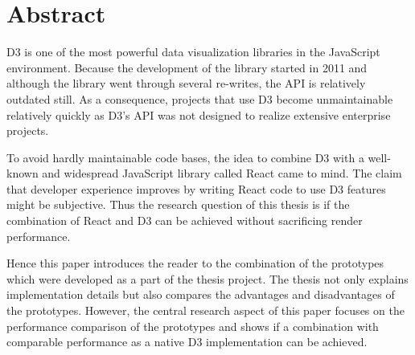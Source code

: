 \chapter{Abstract}

D3 is one of the most powerful data visualization libraries in the JavaScript environment. Because the development of the library started in 2011 and although the library went through several re-writes, the API is relatively outdated still. As a consequence, projects that use D3 become unmaintainable relatively quickly as D3's API was not designed to realize extensive enterprise projects.

To avoid hardly maintainable code bases, the idea to combine D3 with a well-known and widespread JavaScript library called React came to mind. The claim that developer experience improves by writing React code to use D3 features might be subjective. Thus the research question of this thesis is if the combination of React and D3 can be achieved without sacrificing render performance.

Hence this paper introduces the reader to the combination of the prototypes which were developed as a part of the thesis project. The thesis not only explains implementation details but also compares the advantages and disadvantages of the prototypes. However, the central research aspect of this paper focuses on the performance comparison of the prototypes and shows if a combination with comparable performance as a native D3 implementation can be achieved.

